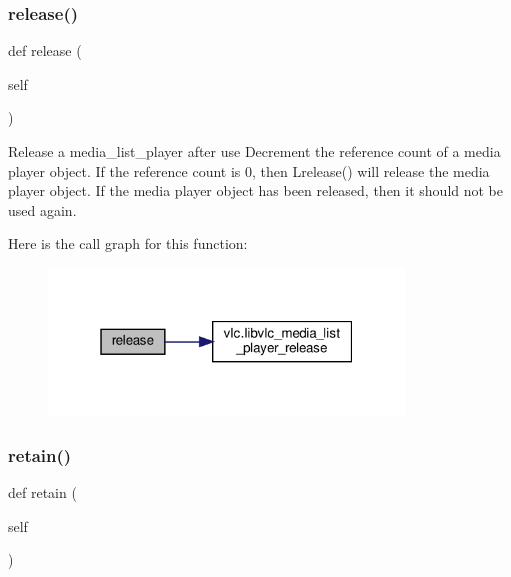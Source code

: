 \subsubsection{\texorpdfstring{release()}{release()}}
{\footnotesize\ttfamily def release (\begin{DoxyParamCaption}\item[{}]{self }\end{DoxyParamCaption})}

\begin{DoxyVerb}Release a media_list_player after use
Decrement the reference count of a media player object. If the
reference count is 0, then L{release}() will
release the media player object. If the media player object
has been released, then it should not be used again.
\end{DoxyVerb}
 Here is the call graph for this function\+:
\nopagebreak
\begin{figure}[H]
\begin{center}
\leavevmode
\includegraphics[width=268pt]{classvlc_1_1_media_list_player_a4cd51e19135e5ad4a19eae3ea9c60537_cgraph}
\end{center}
\end{figure}
\mbox{\label{classvlc_1_1_media_list_player_a6394d82a0b79f0f91bb059d20ab43490}} 
\subsubsection{\texorpdfstring{retain()}{retain()}}
{\footnotesize\ttfamily def retain (\begin{DoxyParamCaption}\item[{}]{self }\end{DoxyParamCaption})}

